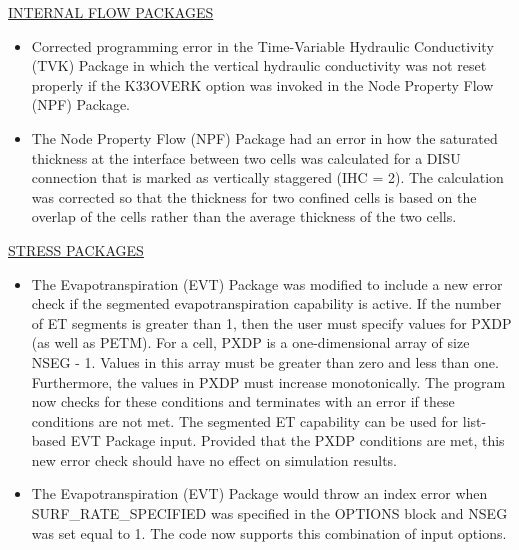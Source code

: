 \documentclass[11pt,twoside,twocolumn]{usgsreport}
\begin{document}
\begin{itemize}
	\underline{INTERNAL FLOW PACKAGES}
	\begin{itemize}
		\item Corrected programming error in the Time-Variable Hydraulic Conductivity (TVK) Package in which the vertical hydraulic conductivity was not reset properly if the K33OVERK option was invoked in the Node Property Flow (NPF) Package.
		\item The Node Property Flow (NPF) Package had an error in how the saturated thickness at the interface between two cells was calculated for a DISU connection that is marked as vertically staggered (IHC = 2).  The calculation was corrected so that the thickness for two confined cells is based on the overlap of the cells rather than the average thickness of the two cells.
	\end{itemize}

	\underline{STRESS PACKAGES}
	\begin{itemize}
		\item The Evapotranspiration (EVT) Package was modified to include a new error check if the segmented evapotranspiration capability is active.  If the number of ET segments is greater than 1, then the user must specify values for PXDP (as well as PETM).  For a cell, PXDP is a one-dimensional array of size NSEG - 1.  Values in this array must be greater than zero and less than one.  Furthermore, the values in PXDP must increase monotonically.  The program now checks for these conditions and terminates with an error if these conditions are not met.  The segmented ET capability can be used for list-based EVT Package input.  Provided that the PXDP conditions are met, this new error check should have no effect on simulation results.
		\item The Evapotranspiration (EVT) Package would throw an index error when SURF\_RATE\_SPECIFIED was specified in the OPTIONS block and NSEG was set equal to 1.  The code now supports this combination of input options.
	\end{itemize}


\end{itemize}
\end{document}
